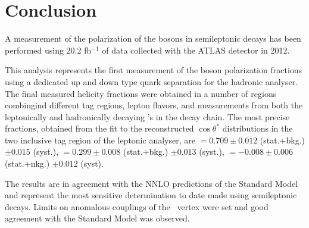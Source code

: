 \section{Conclusion}
\label{sec:conclusion}

A measurement of the polarization of the \w bosons in semileptonic \ttbar decays has been performed using 20.2 fb$^{-1}$ of data collected with the ATLAS detector in 2012.


This analysis represents the first measurement of the \w boson polarization fractions using a dedicated up and down type quark separation for the hadronic analyser.
The final measured helicity fractions were obtained in a number of regions combingind different \bt tag regions, lepton flavors, and measurements from both the leptonically and hadronically decaying \w's in the \ttbar decay chain. The most precise fractions, obtained from the fit to the reconstructed $\cos\theta^*$ distributions in the two inclusive \bt tag region of the leptonic analyser, are \fo$= 0.709 \pm 0.012$ (stat.+bkg.) $\pm 0.015$ (syst.), \fl$= 0.299 \pm 0.008$ (stat.+bkg.) $\pm 0.013$ (syst.), \fr$= -0.008 \pm 0.006$ (stat.+nkg.) $\pm 0.012$ (syst).

The results are in agreement with the NNLO predictions of the Standard Model and represent the most sensitive determination to date made using semileptonic \ttbar decays. Limits on anomalous couplings of the \Wtb\ vertex were set and good agreement with the Standard Model was observed. 




